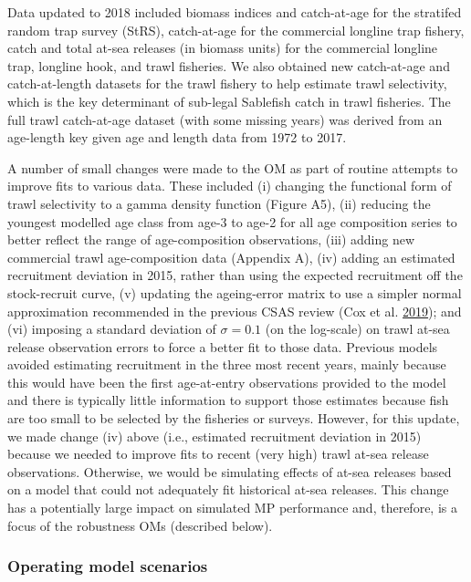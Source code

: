 \documentclass[11pt]{book}
\begin{document}
Data updated to 2018 included biomass indices and catch-at-age for the stratifed random trap survey (StRS), catch-at-age for the commercial longline trap fishery, catch and total at-sea releases (in biomass units) for the commercial longline trap, longline hook, and trawl fisheries. We also obtained new catch-at-age and catch-at-length datasets for the trawl fishery to help estimate trawl selectivity, which is the key determinant of sub-legal Sablefish catch in trawl fisheries. The full trawl catch-at-age dataset (with some missing years) was derived from an age-length key given age and length data from 1972 to 2017.

A number of small changes were made to the OM as part of routine attempts to improve fits to various data. These included (i) changing the functional form of trawl selectivity to a gamma density function (Figure A5), (ii) reducing the youngest modelled age class from age-3 to age-2 for all age composition series to better reflect the range of age-composition observations, (iii) adding new commercial trawl age-composition data (Appendix A), (iv) adding an estimated recruitment deviation in 2015, rather than using the expected recruitment off the stock-recruit curve, (v) updating the ageing-error matrix to use a simpler normal approximation recommended in the previous CSAS review (Cox et al. \protect\hyperlink{ref-cox2019evaluating}{2019}); and (vi) imposing a standard deviation of \(\sigma = 0.1\) (on the log-scale) on trawl at-sea release observation errors to force a better fit to those data. Previous models avoided estimating recruitment in the three most recent years, mainly because this would have been the first age-at-entry observations provided to the model and there is typically little information to support those estimates because fish are too small to be selected by the fisheries or surveys. However, for this update, we made change (iv) above (i.e., estimated recruitment deviation in 2015) because we needed to improve fits to recent (very high) trawl at-sea release observations. Otherwise, we would be simulating effects of at-sea releases based on a model that could not adequately fit historical at-sea releases. This change has a potentially large impact on simulated MP performance and, therefore, is a focus of the robustness OMs (described below).

\hypertarget{operating-model-scenarios}{%
\subsubsection{Operating model scenarios}\label{operating-model-scenarios}}
\end{document}
